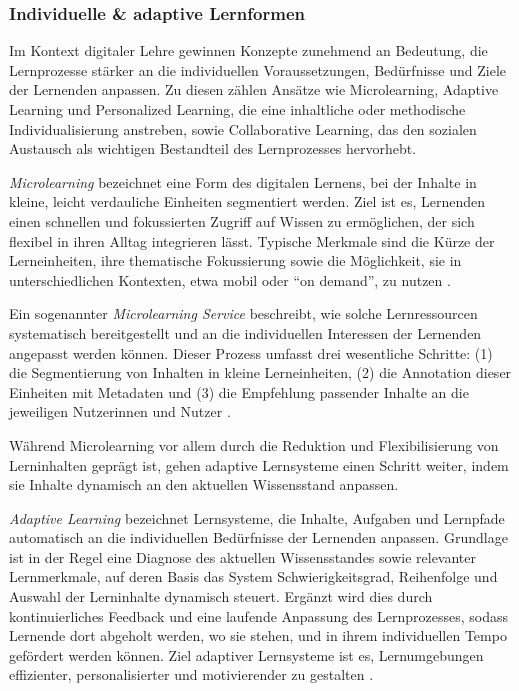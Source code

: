 \subsubsection{Individuelle \& adaptive Lernformen}

Im Kontext digitaler Lehre gewinnen Konzepte zunehmend an Bedeutung, die Lernprozesse stärker an die individuellen Voraussetzungen, Bedürfnisse und Ziele der Lernenden anpassen. Zu diesen zählen Ansätze wie Microlearning, Adaptive Learning und Personalized Learning, die eine inhaltliche oder methodische Individualisierung anstreben, sowie Collaborative Learning, das den sozialen Austausch als wichtigen Bestandteil des Lernprozesses hervorhebt.

\textit{Microlearning} bezeichnet eine Form des digitalen Lernens, bei der Inhalte in kleine, leicht verdauliche Einheiten segmentiert werden. Ziel ist es, Lernenden einen schnellen und fokussierten Zugriff auf Wissen zu ermöglichen, der sich flexibel in ihren Alltag integrieren lässt. Typische Merkmale sind die Kürze der Lerneinheiten, ihre thematische Fokussierung sowie die Möglichkeit, sie in unterschiedlichen Kontexten, etwa mobil oder \enquote{on demand}, zu nutzen \parencite[S.~74]{chong_mvr-cls_2022}.

Ein sogenannter \textit{Microlearning Service} beschreibt, wie solche Lernressourcen systematisch bereitgestellt und an die individuellen Interessen der Lernenden angepasst werden können. Dieser Prozess umfasst drei wesentliche Schritte: (1) die Segmentierung von Inhalten in kleine Lerneinheiten, (2) die Annotation dieser Einheiten mit Metadaten und (3) die Empfehlung passender Inhalte an die jeweiligen Nutzerinnen und Nutzer \parencite[S.~152--154]{lin_survey_2019}.

Während Microlearning vor allem durch die Reduktion und Flexibilisierung von Lerninhalten geprägt ist, gehen adaptive Lernsysteme einen Schritt weiter, indem sie Inhalte dynamisch an den aktuellen Wissensstand anpassen.

\textit{Adaptive Learning} bezeichnet Lernsysteme, die Inhalte, Aufgaben und Lernpfade automatisch an die individuellen Bedürfnisse der Lernenden anpassen. Grundlage ist in der Regel eine Diagnose des aktuellen Wissensstandes sowie relevanter Lernmerkmale, auf deren Basis das System Schwierigkeitsgrad, Reihenfolge und Auswahl der Lerninhalte dynamisch steuert. Ergänzt wird dies durch kontinuierliches Feedback und eine laufende Anpassung des Lernprozesses, sodass Lernende dort abgeholt werden, wo sie stehen, und in ihrem individuellen Tempo gefördert werden können. Ziel adaptiver Lernsysteme ist es, Lernumgebungen effizienter, personalisierter und motivierender zu gestalten \parencite[S.~448]{zhao_research_2019}.

